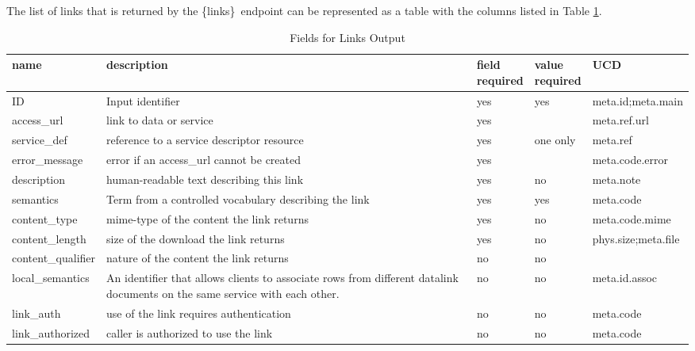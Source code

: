 \documentclass[11pt,a4paper]{ivoa}
\newcommand{\blinks}{\{links\}}
\begin{document}
The list of links that is returned by the \blinks\ endpoint can be
represented as a table with the columns listed in Table \ref{fig:linkFields}.
\begin{table}[h]
\begin{center}
\begin{tabular}{|l|p{}|p{}|p{}|l|}
\hline
{\bf name}      & {\bf description} & {\bf field \newline required}
                & {\bf value \newline required} & {\bf UCD} \\
\hline
ID              & Input identifier & yes & yes & meta.id;meta.main \\
\hline
access\_url     & link to data or service
                & yes &          & meta.ref.url \\
\cline{1-3} \cline{5-5}
service\_def    & reference to a service descriptor resource
                & yes & one only & meta.ref \\
\cline{1-3} \cline{5-5}
error\_message  & error if an access\_url cannot be created
                & yes &          & meta.code.error \\
\hline
description     & human-readable text describing this link
                & yes & no & meta.note \\
\hline
semantics       & Term from a controlled vocabulary describing the link
                & yes & yes & meta.code \\
\hline
content\_type   & mime-type of the content the link returns
                & yes & no & meta.code.mime \\
\hline
content\_length & size of the download the link returns
                & yes & no & phys.size;meta.file \\
\hline
content\_qualifier & nature of the content the link returns
                & no & no & \\
\hline
local\_semantics &   An identifier that allows clients to associate rows from
  different datalink documents on the same service with each other.
                & no & no & meta.id.assoc \\
\hline
link\_auth       & use of the link requires authentication
                 & no & no & meta.code \\
\hline
link\_authorized & caller is authorized to use the link
                 & no & no & meta.code \\
\hline
\end{tabular}
\end{center}
\caption{Fields for Links Output}
\label{fig:linkFields}
\end{table}
\end{document}
